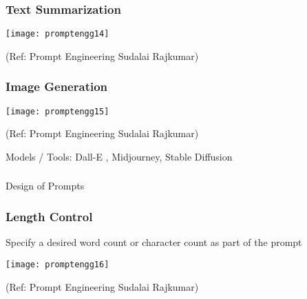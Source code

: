 \begin{frame}[fragile]\frametitle{Text Summarization}

\begin{center}
\texttt{[image: promptengg14]}

{\tiny (Ref: Prompt Engineering Sudalai Rajkumar)}

\end{center}		
		


\end{frame}

\begin{frame}[fragile]\frametitle{Image Generation}

\begin{center}
\texttt{[image: promptengg15]}

{\tiny (Ref: Prompt Engineering Sudalai Rajkumar)}

\end{center}		
		
		
Models / Tools: Dall-E , Midjourney, Stable Diffusion



\end{frame}


\begin{frame}[fragile]\frametitle{}
\begin{center}
{\Large Design of Prompts}
\end{center}
\end{frame}

\begin{frame}[fragile]\frametitle{Length Control}

Specify a desired word count or character count as part of the prompt

\begin{center}
\texttt{[image: promptengg16]}

{\tiny (Ref: Prompt Engineering Sudalai Rajkumar)}

\end{center}		
		
		


\end{frame}

